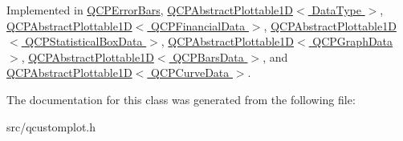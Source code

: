Implemented in \hyperlink{classQCPErrorBars_af75958b95d9b9c7edfd9851c1d123850}{Q\+C\+P\+Error\+Bars}, \hyperlink{classQCPAbstractPlottable1D_afe0d56e39cc076032922f059b304c092}{Q\+C\+P\+Abstract\+Plottable1\+D$<$ Data\+Type $>$}, \hyperlink{classQCPAbstractPlottable1D_afe0d56e39cc076032922f059b304c092}{Q\+C\+P\+Abstract\+Plottable1\+D$<$ Q\+C\+P\+Financial\+Data $>$}, \hyperlink{classQCPAbstractPlottable1D_afe0d56e39cc076032922f059b304c092}{Q\+C\+P\+Abstract\+Plottable1\+D$<$ Q\+C\+P\+Statistical\+Box\+Data $>$}, \hyperlink{classQCPAbstractPlottable1D_afe0d56e39cc076032922f059b304c092}{Q\+C\+P\+Abstract\+Plottable1\+D$<$ Q\+C\+P\+Graph\+Data $>$}, \hyperlink{classQCPAbstractPlottable1D_afe0d56e39cc076032922f059b304c092}{Q\+C\+P\+Abstract\+Plottable1\+D$<$ Q\+C\+P\+Bars\+Data $>$}, and \hyperlink{classQCPAbstractPlottable1D_afe0d56e39cc076032922f059b304c092}{Q\+C\+P\+Abstract\+Plottable1\+D$<$ Q\+C\+P\+Curve\+Data $>$}.



The documentation for this class was generated from the following file\+:\begin{DoxyCompactItemize}
\item 
src/qcustomplot.\+h\end{DoxyCompactItemize}
